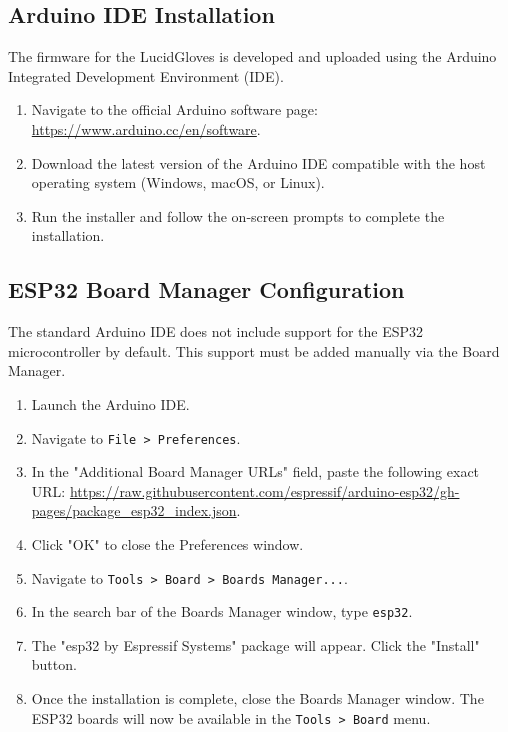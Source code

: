 \documentclass{article}
\begin{document}
\subsection{Arduino IDE Installation}
The firmware for the LucidGloves is developed and uploaded using the Arduino Integrated Development Environment (IDE).
\begin{enumerate}
    \item Navigate to the official Arduino software page: \url{https://www.arduino.cc/en/software}.
    \item Download the latest version of the Arduino IDE compatible with the host operating system (Windows, macOS, or Linux).
    \item Run the installer and follow the on-screen prompts to complete the installation.
\end{enumerate}

\subsection{ESP32 Board Manager Configuration}
The standard Arduino IDE does not include support for the ESP32 microcontroller by default. This support must be added manually via the Board Manager.
\begin{enumerate}
    \item Launch the Arduino IDE.
    \item Navigate to \texttt{File > Preferences}.
    \item In the "Additional Board Manager URLs" field, paste the following exact URL: \url{https://raw.githubusercontent.com/espressif/arduino-esp32/gh-pages/package_esp32_index.json}.
    \item Click "OK" to close the Preferences window.
    \item Navigate to \texttt{Tools > Board > Boards Manager...}.
    \item In the search bar of the Boards Manager window, type \texttt{esp32}.
    \item The "esp32 by Espressif Systems" package will appear. Click the "Install" button.
    \item Once the installation is complete, close the Boards Manager window. The ESP32 boards will now be available in the \texttt{Tools > Board} menu.
\end{enumerate}
\end{document}
